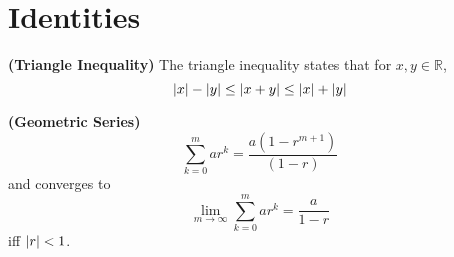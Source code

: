 \section{Identities}
\begin{identity}
  \textbf{\textup{(Triangle Inequality)}}
  The triangle inequality states that for $x, y \in \mathbb{R}$,
  \begin{equation}
    \abs{x} - \abs{y} \leq \abs{x + y} \leq \abs{x} + \abs{y}
  \end{equation}
\end{identity}

\begin{identity}
  \textbf{\textup{(Geometric Series)}}
  \begin{equation}
    \sum_{k=0}^m ar^k = \frac{a(1-r^{m+1})}{(1-r)}
    \label{eq:geometric_series}
  \end{equation}
  and converges to 
  \begin{equation*}
    \lim_{m\to\infty} \sum_{k=0}^m ar^k = \frac{a}{1-r}
  \end{equation*}
  iff $\abs{r} < 1$.
\end{identity}